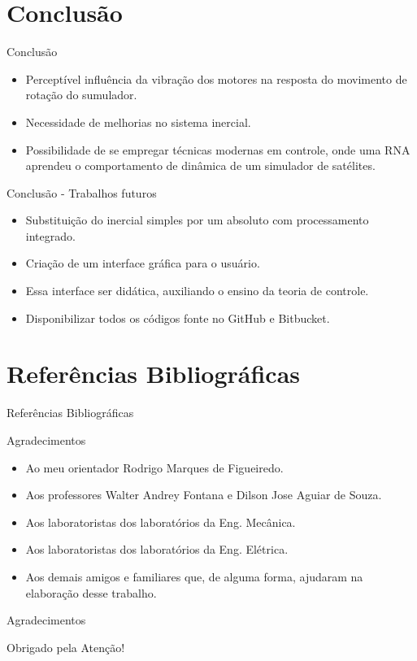 \documentclass{beamer}
\begin{document}

\section{Conclusão}
	\begin{frame}{Conclusão}
    \begin{itemize}
        	\justifying
			\item Perceptível influência da vibração dos motores na resposta do movimento de rotação do sumulador.
			\item Necessidade de melhorias no sistema inercial.
			\item Possibilidade de se empregar técnicas modernas em controle, onde uma RNA aprendeu o comportamento de dinâmica de um simulador de satélites.
		\end{itemize}
\end{frame}


\begin{frame}{Conclusão - Trabalhos futuros}
    \begin{itemize}
        \justifying
		\item Substituição do inercial simples por um absoluto com processamento integrado. 
		\item Criação de um interface gráfica para o usuário.
		\item Essa interface ser didática, auxiliando o ensino da teoria de controle.  
		\item Disponibilizar todos os códigos fonte no GitHub e Bitbucket.
		\end{itemize}
\end{frame}


\section{Referências Bibliográficas}
\begin{frame}{Referências Bibliográficas}
	
\end{frame}
        

\begin{frame}{Agradecimentos}
	\begin{itemize}
        \justifying
        	\item Ao meu orientador Rodrigo Marques de Figueiredo. 
        	\item Aos professores Walter Andrey Fontana e Dilson Jose Aguiar de Souza.
			\item Aos laboratoristas dos laboratórios da Eng. Mecânica.
			\item Aos laboratoristas dos laboratórios da Eng. Elétrica.
			\item Aos demais amigos e familiares que, de alguma forma, ajudaram na elaboração desse trabalho.  
		\end{itemize}
	\end{frame}


\begin{frame}{Agradecimentos}
		\begin{center}
			{\Huge Obrigado pela Atenção!}
		\end{center}
\end{frame}
\end{document}
